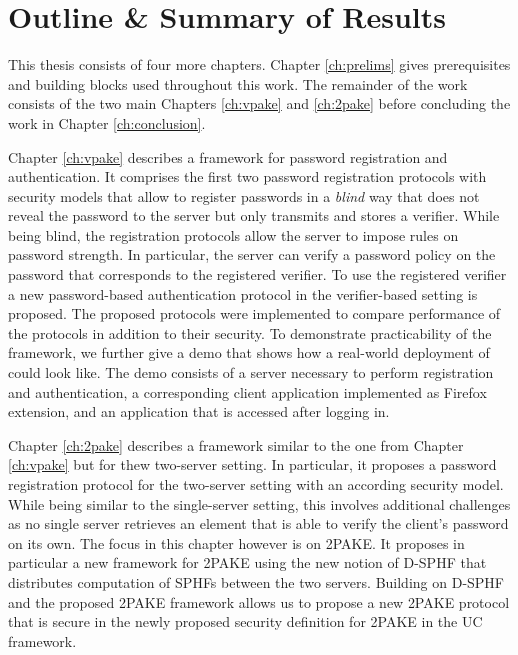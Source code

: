 \section{Outline \& Summary of Results}\label{sec:intro:outline}
This thesis consists of four more chapters.
Chapter \ref{ch:prelims} gives prerequisites and building blocks used throughout this work.
The remainder of the work consists of the two main Chapters \ref{ch:vpake} and \ref{ch:2pake} before concluding the work in Chapter \ref{ch:conclusion}.

Chapter \ref{ch:vpake} describes a framework for password registration and authentication.
It comprises the first two password registration protocols with security models that allow to register passwords in a \emph{blind} way that does not reveal the password to the server but only transmits and stores a verifier.
While being blind, the registration protocols allow the server to impose rules on password strength.
In particular, the server can verify a password policy on the password that corresponds to the registered verifier.
To use the registered verifier a new password-based authentication protocol in the verifier-based setting is proposed.
The proposed protocols were implemented to compare performance of the protocols in addition to their security.
To demonstrate practicability of the framework, we further give a demo that shows how a real-world deployment of could look like.
The demo consists of a server necessary to perform registration and authentication, a corresponding client application implemented as Firefox extension, and an application that is accessed after logging in.

Chapter \ref{ch:2pake} describes a framework similar to the one from Chapter \ref{ch:vpake} but for thew two-server setting.
In particular, it proposes a password registration protocol for the two-server setting with an according security model.
While being similar to the single-server setting, this involves additional challenges as no single server retrieves an element that is able to verify the client's password on its own.
The focus in this chapter however is on \ac{2PAKE}.
It proposes in particular a new framework for \ac{2PAKE} using the new notion of \ac{D-SPHF} that distributes computation of \acp{SPHF} between the two servers.
Building on \ac{D-SPHF} and the proposed \ac{2PAKE} framework allows us to propose a new \ac{2PAKE} protocol that is secure in the newly proposed security definition for \ac{2PAKE} in the \ac{UC} framework.



